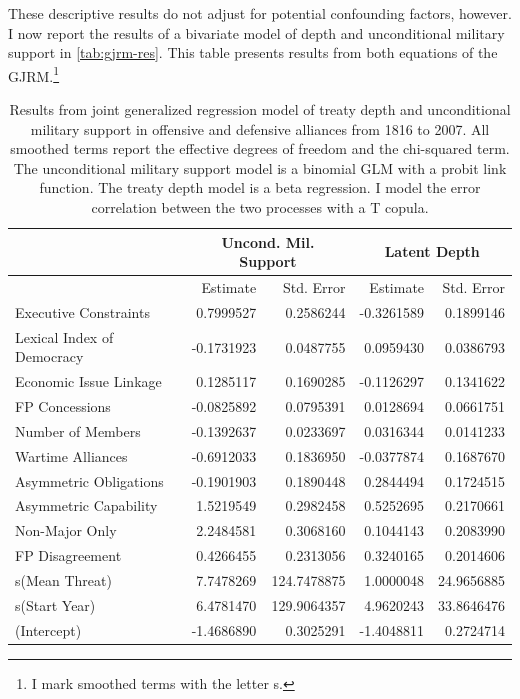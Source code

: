 \documentclass[12pt]{article}
\begin{document}
These descriptive results do not adjust for potential confounding factors, however.
I now report the results of a bivariate model of depth and unconditional military support in \autoref{tab:gjrm-res}. 
This table presents results from both equations of the GJRM.\footnote{I mark smoothed terms with the letter s.} 


\begin{table}[ht]
\centering
\begin{tabular}{lrrrr}
  & \multicolumn{2}{c}{Uncond. Mil. Support} & \multicolumn{2}{c}{Latent Depth}\\ \hline
  & Estimate & Std. Error & Estimate & Std. Error \\ 
  \hline
  Executive Constraints & 0.7999527 & 0.2586244 & -0.3261589 & 0.1899146 \\ 
  Lexical Index of Democracy & -0.1731923 & 0.0487755 & 0.0959430 & 0.0386793 \\ 
  Economic Issue Linkage & 0.1285117 & 0.1690285 & -0.1126297 & 0.1341622 \\ 
  FP Concessions & -0.0825892 & 0.0795391 & 0.0128694 & 0.0661751 \\ 
  Number of Members & -0.1392637 & 0.0233697 & 0.0316344 & 0.0141233 \\ 
  Wartime Alliances & -0.6912033 & 0.1836950 & -0.0377874 & 0.1687670 \\ 
  Asymmetric Obligations & -0.1901903 & 0.1890448 & 0.2844494 & 0.1724515 \\ 
  Asymmetric Capability & 1.5219549 & 0.2982458 & 0.5252695 & 0.2170661 \\ 
  Non-Major Only & 2.2484581 & 0.3068160 & 0.1044143 & 0.2083990 \\ 
  FP Disagreement & 0.4266455 & 0.2313056 & 0.3240165 & 0.2014606 \\ 
  s(Mean Threat) & 7.7478269 & 124.7478875 & 1.0000048 & 24.9656885 \\ 
  s(Start Year) & 6.4781470 & 129.9064357 & 4.9620243 & 33.8646476 \\ 
  (Intercept) & -1.4686890 & 0.3025291 & -1.4048811 & 0.2724714 \\ 
   \hline
\end{tabular}
\caption{Results from joint generalized regression model of treaty depth and unconditional military support in 
         offensive and defensive alliances from 1816 to 2007. 
                     All smoothed terms report the effective degrees of freedom and the chi-squared term. 
                     The unconditional military support model is a binomial GLM with a probit link function. 
                     The treaty depth model is a beta regression. 
                     I model the error correlation between the two processes with a T copula.} 
\label{tab:gjrm-res}
\end{table}
\end{document}
